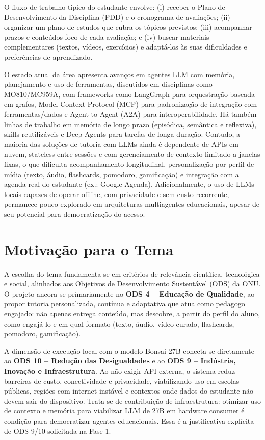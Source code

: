 \documentclass[12pt]{article}
\begin{document}
O fluxo de trabalho típico do estudante envolve: (i) receber o Plano de Desenvolvimento da Disciplina (PDD) e o cronograma de avaliações; (ii) organizar um plano de estudos que cubra os tópicos previstos; (iii) acompanhar prazos e conteúdos foco de cada avaliação; e (iv) buscar materiais complementares (textos, vídeos, exercícios) e adaptá-los às suas dificuldades e preferências de aprendizado.

O estado atual da área apresenta avanços em agentes LLM com memória, planejamento e uso de ferramentas, discutidos em disciplinas como MO810/MC959A, com frameworks como LangGraph para orquestração baseada em grafos, Model Context Protocol (MCP) para padronização de integração com ferramentas/dados e Agent-to-Agent (A2A) para interoperabilidade. Há também linhas de trabalho em memória de longo prazo (episódica, semântica e reflexiva), skills reutilizáveis e Deep Agents para tarefas de longa duração. Contudo, a maioria das soluções de tutoria com LLMs ainda é dependente de APIs em nuvem, stateless entre sessões e com gerenciamento de contexto limitado a janelas fixas, o que dificulta acompanhamento longitudinal, personalização por perfil de mídia (texto, áudio, flashcards, pomodoro, gamificação) e integração com a agenda real do estudante (ex.: Google Agenda). Adicionalmente, o uso de LLMs locais capazes de operar offline, com privacidade e sem custo recorrente, permanece pouco explorado em arquiteturas multiagentes educacionais, apesar de seu potencial para democratização do acesso.

\section{Motivação para o Tema}
\label{sec:motivacao}

A escolha do tema fundamenta-se em critérios de relevância científica, tecnológica e social, alinhados aos Objetivos de Desenvolvimento Sustentável (ODS) da ONU. O projeto ancora-se primariamente no \textbf{ODS 4 -- Educação de Qualidade}, ao propor tutoria personalizada, contínua e adaptativa que atua como pedagogo engajado: não apenas entrega conteúdo, mas descobre, a partir do perfil do aluno, como engajá-lo e em qual formato (texto, áudio, vídeo curado, flashcards, pomodoro, gamificação).

A dimensão de execução local com o modelo Bonsai 27B conecta-se diretamente ao \textbf{ODS 10 -- Redução das Desigualdades} e ao \textbf{ODS 9 -- Indústria, Inovação e Infraestrutura}. Ao não exigir API externa, o sistema reduz barreiras de custo, conectividade e privacidade, viabilizando uso em escolas públicas, regiões com internet instável e contextos onde dados do estudante não devem sair do dispositivo. Trata-se de contribuição de infraestrutura: otimizar uso de contexto e memória para viabilizar LLM de 27B em hardware consumer é condição para democratizar agentes educacionais. Essa é a justificativa explícita de ODS 9/10 solicitada na Fase 1.
\end{document}
